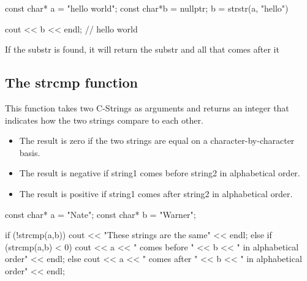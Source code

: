 \documentclass{report}
\begin{document}
    \begin{cppcode}
const char* a = "hello world";
const char*b = nullptr;
b = strstr(a, "hello")

cout << b << endl; // hello world
    \end{cppcode}
    
    \bigbreak \noindent 
    \begin{notebox}
			If the substr is found, it will return the substr and all that comes after it
		\end{notebox}
    \bigbreak \noindent 

    \pagebreak \bigbreak \noindent 
    \subsection{The strcmp function}
    \bigbreak \noindent 
    This function takes two C-Strings as arguments and returns an integer that indicates how the two strings compare to each other. 
    \begin{itemize}
        \item The result is zero if the two strings are equal on a character-by-character basis.
        \item The result is negative if string1 comes before string2 in alphabetical order.
        \item The result is positive if string1 comes after string2 in alphabetical order.
    \end{itemize}
    \bigbreak \noindent 
    
    \begin{cppcode}
const char* a = "Nate";
const char* b = "Warner";

if (!strcmp(a,b)) {
    cout << "These strings are the same" << endl;
} else if (strcmp(a,b) < 0) {
    cout << a << " comes before " << b << " in alphabetical order" << endl;
} else {
    cout << a << " comes after " << b << " in alphabetical order" << endl;
}
    \end{cppcode}
    

    \bigbreak \noindent 
\end{document}

